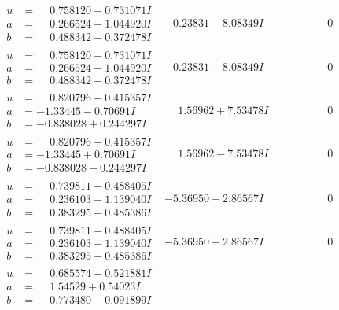 \documentclass[1p]{elsarticle_modified}
\theoremstyle{definition}
\begin{document}
$$\begin{array}{c|c|c}
\begin{aligned}
u &= \phantom{-}0.758120 + 0.731071 I \\
a &= \phantom{-}0.266524 + 1.044920 I \\
b &= \phantom{-}0.488342 + 0.372478 I\end{aligned}
 & -0.23831 - 8.08349 I & \phantom{-0.000000 } 0 \\ \hline\begin{aligned}
u &= \phantom{-}0.758120 - 0.731071 I \\
a &= \phantom{-}0.266524 - 1.044920 I \\
b &= \phantom{-}0.488342 - 0.372478 I\end{aligned}
 & -0.23831 + 8.08349 I & \phantom{-0.000000 } 0 \\ \hline\begin{aligned}
u &= \phantom{-}0.820796 + 0.415357 I \\
a &= -1.33445 - 0.70691 I \\
b &= -0.838028 + 0.244297 I\end{aligned}
 & \phantom{-}1.56962 + 7.53478 I & \phantom{-0.000000 } 0 \\ \hline\begin{aligned}
u &= \phantom{-}0.820796 - 0.415357 I \\
a &= -1.33445 + 0.70691 I \\
b &= -0.838028 - 0.244297 I\end{aligned}
 & \phantom{-}1.56962 - 7.53478 I & \phantom{-0.000000 } 0 \\ \hline\begin{aligned}
u &= \phantom{-}0.739811 + 0.488405 I \\
a &= \phantom{-}0.236103 + 1.139040 I \\
b &= \phantom{-}0.383295 + 0.485386 I\end{aligned}
 & -5.36950 - 2.86567 I & \phantom{-0.000000 } 0 \\ \hline\begin{aligned}
u &= \phantom{-}0.739811 - 0.488405 I \\
a &= \phantom{-}0.236103 - 1.139040 I \\
b &= \phantom{-}0.383295 - 0.485386 I\end{aligned}
 & -5.36950 + 2.86567 I & \phantom{-0.000000 } 0 \\ \hline\begin{aligned}
u &= \phantom{-}0.685574 + 0.521881 I \\
a &= \phantom{-}1.54529 + 0.54023 I \\
b &= \phantom{-}0.773480 - 0.091899 I\end{aligned}

\end{array}$$
\end{document}
